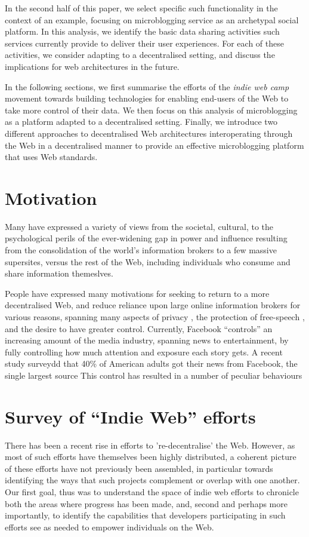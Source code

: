 \documentclass{article}
\begin{document}
{{In the second half of this paper, we select specific such functionality in the context of an example, focusing on microblogging service as an archetypal social platform.  In this analysis, we identify the basic data sharing activities such services currently provide to deliver their user experiences. For each of these activities, we consider adapting to a decentralised setting, and discuss the implications for web architectures in the future.

In the following sections, we first summarise the efforts of the \emph{indie web camp} movement towards building technologies for enabling end-users of the Web to take more control of their data. We then focus on this analysis of microblogging as a platform adapted to a decentralised setting.  Finally, we introduce two different approaches to decentralised Web architectures interoperating  through the Web in a decentralised manner to provide an effective microblogging platform that uses Web standards.

\section{Motivation}

Many have expressed a variety of views from the societal, cultural, to the psychological perils of the ever-widening gap in power and influence resulting from the consolidation of the world's information brokers to a few massive supersites, versus the rest of the Web, including individuals who consume and share information themeslves.

People have expressed many motivations for seeking to return to a more decentralised Web, and reduce reliance upon large online information brokers for various reasons, spanning many aspects of privacy \cite{}, the protection of free-speech \cite{}, and the desire to have greater control. Currently, Facebook ``controls'' an increasing amount of the media industry, spanning news to entertainment, by fully controlling how much attention and exposure each story gets.  A recent study surveydd that 40\% of American adults got their news from Facebook, the single largest source  This control has resulted in a number of peculiar behaviours 

\section{Survey of ``Indie Web'' efforts}

There has been a recent rise in efforts to 're-decentralise' the Web. However, as most of such efforts have themselves been highly distributed, a coherent picture of these efforts have not previously been assembled, in particular towards identifying the ways that such projects complement or overlap with one another. Our first goal, thus was to understand the space of indie web efforts to chronicle both the areas where progress has been made, and, second and perhaps more importantly, to identify the capabilities that developers participating in such efforts see as needed to empower individuals on the Web. 

}}
\end{document}
